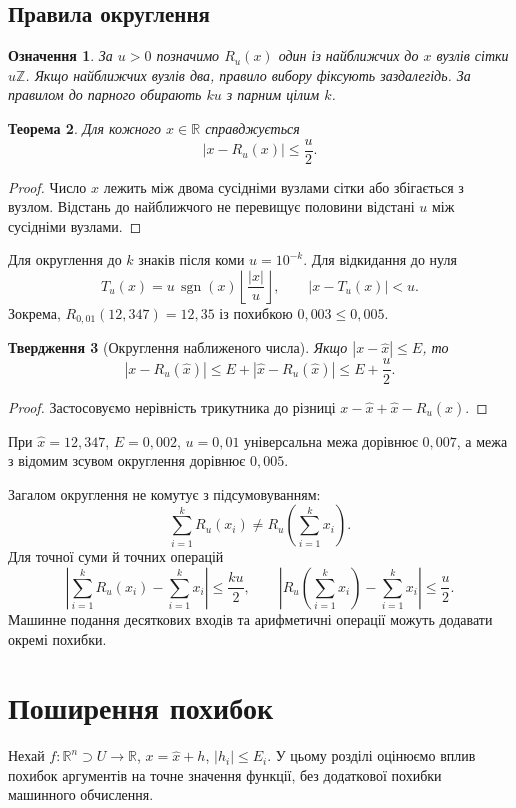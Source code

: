 \documentclass[11pt,a4paper]{article}
\newtheorem{definition}{Означення}[section]
\newtheorem{theorem}[definition]{Теорема}
\newtheorem{proposition}[definition]{Твердження}
\theoremstyle{remark}
\newcommand{\R}{\mathbb R}
\newcommand{\xh}{\widehat x}
\DeclareMathOperator{\sgn}{sgn}
\begin{document}
\subsection*{Правила округлення}
\begin{definition}
За $u>0$ позначимо $R_u(x)$ один із найближчих до $x$ вузлів сітки $u\mathbb Z$. Якщо найближчих вузлів два, правило вибору фіксують заздалегідь. За правилом до парного обирають $ku$ з парним цілим $k$.
\end{definition}
\begin{theorem}
Для кожного $x\in\R$ справджується
\begin{equation}
 |x-R_u(x)|\le\frac u2.
\end{equation}
\end{theorem}
\begin{proof}
Число $x$ лежить між двома сусідніми вузлами сітки або збігається з вузлом. Відстань до найближчого не перевищує половини відстані $u$ між сусідніми вузлами.
\end{proof}
Для округлення до $k$ знаків після коми $u=10^{-k}$. Для відкидання до нуля
\[
 T_u(x)=u\,\sgn(x)\left\lfloor\frac{|x|}{u}\right\rfloor,
 \qquad |x-T_u(x)|<u.
\]
Зокрема, $R_{0{,}01}(12{,}347)=12{,}35$ із похибкою $0{,}003\le0{,}005$.

\begin{proposition}[Округлення наближеного числа]
Якщо $|x-\xh|\le E$, то
\begin{equation}
 |x-R_u(\xh)|\le E+|\xh-R_u(\xh)|\le E+\frac u2.
\end{equation}
\end{proposition}
\begin{proof}
Застосовуємо нерівність трикутника до різниці $x-\xh+\xh-R_u(\xh)$.
\end{proof}
При $\xh=12{,}347$, $E=0{,}002$, $u=0{,}01$ універсальна межа дорівнює $0{,}007$, а межа з відомим зсувом округлення дорівнює $0{,}005$.

Загалом округлення не комутує з підсумовуванням:
\[
 \sum_{i=1}^kR_u(x_i)\ne R_u\!\left(\sum_{i=1}^kx_i\right).
\]
Для точної суми й точних операцій
\[
 \left|\sum_{i=1}^kR_u(x_i)-\sum_{i=1}^kx_i\right|\le\frac{ku}{2},\qquad
 \left|R_u\!\left(\sum_{i=1}^kx_i\right)-\sum_{i=1}^kx_i\right|\le\frac u2.
\]
Машинне подання десяткових входів та арифметичні операції можуть додавати окремі похибки.

\section{Поширення похибок}
Нехай $f:\R^n\supset U\to\R$, $x=\xh+h$, $|h_i|\le E_i$. У цьому розділі оцінюємо вплив похибок аргументів на точне значення функції, без додаткової похибки машинного обчислення.
\end{document}

